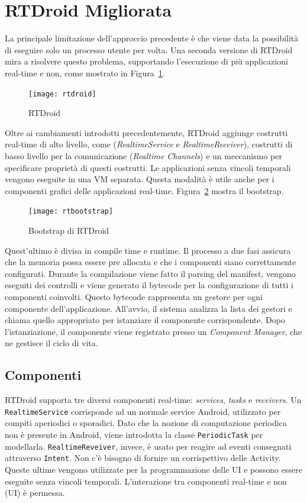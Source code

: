 \section{RTDroid Migliorata}
La principale limitazione dell'approccio precedente è che viene data la possibilità di eseguire solo un processo utente per volta. Una seconda versione di RTDroid mira a risolvere questo problema, supportando l'esecuzione di più applicazioni real-time e non, come mostrato in Figura~\ref{fig:rtdroid}.

\begin{figure}[h]
	\centering
	\texttt{[image: rtdroid]}
	\caption{RTDroid}
	\label{fig:rtdroid}
\end{figure}

Oltre ai cambiamenti introdotti precedentemente, RTDroid aggiunge costrutti real-time di alto livello, come (\textit{RealtimeService} e \textit{RealtimeReceiver}), costrutti di basso livello per la comunicazione (\textit{Realtime Channels}) e un meccanismo per specificare proprietà di questi costrutti. Le applicazioni senza vincoli temporali vengono eseguite in una VM separata. Questa modalità è utile anche per i componenti grafici delle applicazioni real-time. Figura~\ref{fig:rtbootstrap} mostra il bootstrap.
\begin{figure}[h]
	\centering
	\texttt{[image: rtbootstrap]}
	\caption{Bootstrap di RTDroid}
	\label{fig:rtbootstrap}
\end{figure}

Quest'ultimo è divisa in compile time e runtime. Il processo a due fasi assicura che la memoria possa essere pre allocata e che i componenti siano correttamente configurati. Durante la compilazione viene fatto il parsing del manifest, vengono eseguiti dei controlli e viene generato il bytecode per la configurazione di tutti i componenti coinvolti. Questo bytecode rappresenta un gestore per ogni componente dell'applicazione. All'avvio, il sistema analizza la lista dei gestori e chiama quello appropriato per istanziare il componente corrispondente. Dopo l'istanziazione, il componente viene registrato presso un \textit{Component Manager}, che ne gestisce il ciclo di vita.

\subsection{Componenti}
RTDroid supporta tre diversi componenti real-time: \textit{services}, \textit{tasks} e \textit{receivers}. Un \texttt{RealtimeService} corrisponde ad un normale service Android, utilizzato per compiti aperiodici o sporadici. Dato che la nozione di computazione periodica non è presente in Android, viene introdotta la classe \texttt{PeriodicTask} per modellarla. \texttt{RealtimeReveiver}, invece, è usato per reagire ad eventi consegnati attraverso \texttt{Intent}. Non c'è bisogno di fornire un corrispettivo delle Activity. Queste ultime vengono utilizzate per la programmazione delle UI e possono essere eseguite senza vincoli temporali. L'interazione tra componenti real-time e non (UI) è permessa.

